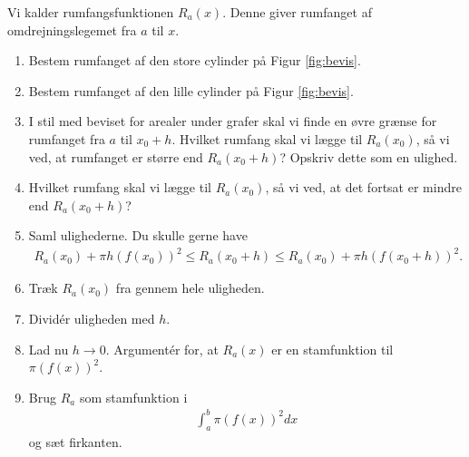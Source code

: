 Vi kalder rumfangsfunktionen $R_a(x)$. Denne giver rumfanget af omdrejningslegemet fra $a$ til $x$. 
\begin{enumerate}[label=\roman*)]
	\item Bestem rumfanget af den store cylinder på Figur \ref{fig:bevis}.
	\item Bestem rumfanget af den lille cylinder på Figur \ref{fig:bevis}.
	\item I stil med beviset for arealer under grafer skal vi finde en øvre grænse for rumfanget fra $a$ til $x_0 + h$. 
	Hvilket rumfang skal vi lægge til $R_a(x_0)$, så vi ved, at rumfanget er større end $R_a(x_0 + h)$? Opskriv 
	dette som en ulighed.
	\item Hvilket rumfang skal vi lægge til $R_a(x_0)$, så vi ved, at det fortsat er mindre end $R_a(x_0 + h)$?
	\item Saml ulighederne. Du skulle gerne have 
	\begin{align*}
		R_a(x_0) + \pi h (f(x_0))^2 \leq R_a(x_0 + h) \leq R_a(x_0) + \pi h (f(x_0 + h))^2.	
	\end{align*}	 
	\item Træk $R_a(x_0)$ fra gennem hele uligheden.
	\item Dividér uligheden med $h$. 
	\item Lad nu $h \to 0$. Argumentér for, at $R_a(x)$ er en stamfunktion til $\pi (f(x))^2$.
	\item Brug $R_a$ som stamfunktion i 
	\begin{align*}
		\int_a^b \pi (f(x))^2 dx 
	\end{align*}
	og sæt firkanten.
\end{enumerate}

\newpage
